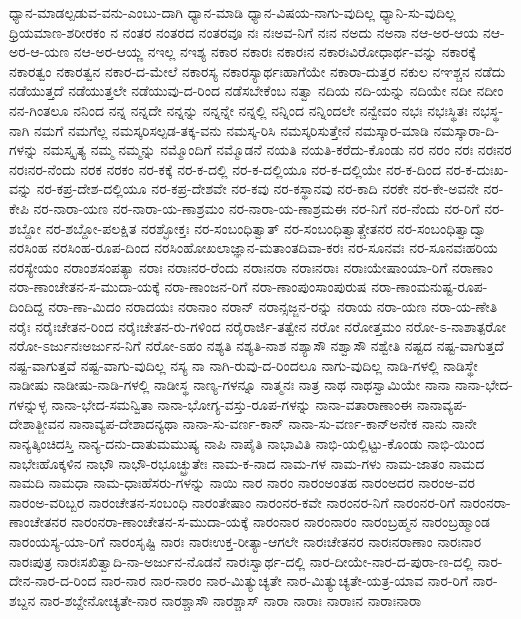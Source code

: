 {ಧ್ಯಾನ-ಮಾಡಲ್ಪಡುವ-ವನು-ಎಂಬು-ದಾಗಿ
ಧ್ಯಾನ-ಮಾಡಿ
ಧ್ಯಾನ-ವಿಷಯ-ನಾಗು-ವುದಿಲ್ಲ
ಧ್ಯಾನಿ-ಸು-ವುದಿಲ್ಲ
ಧ್ರಿಯಮಾಣ-ಶರೀರಕಂ
ನ
ನಂತರ
ನಂತರದ
ನಂತರವೂ
ನಃ
ನಃಅವ-ನಿಗೆ
ನಃನ
ನಅದು
ನಅನಾ
ನಆ-ಅರ-ಆಯ
ನಆ-ಅರ-ಆ-ಯಣ
ನಆ-ಅರ-ಆಯ್ಣ
ನಇಲ್ಲ
ನಇಶ್ಯ
ನಕಾರ
ನಕಾರಃ
ನಕಾರಃನ
ನಕಾರಃವಿರೋಧಾರ್ಥ-ವನ್ನು
ನಕಾರಕ್ಕೆ
ನಕಾರತ್ವಂ
ನಕಾರತ್ವನ
ನಕಾರ-ದ-ಮೇಲೆ
ನಕಾರಸ್ಯ
ನಕಾರಸ್ಯಾರ್ಥಃಹಾಗೆಯೇ
ನಕಾರಾ-ದುತ್ತರ
ನಕುಲ
ನಞಶ್ಚನ
ನಡೆದು
ನಡೆಯುತ್ತದೆ
ನಡೆಯುತ್ತಲೇ
ನಡೆಯುವು-ದ-ರಿಂದ
ನಡೆಸಬೇಕೆಂಬ
ನತ್ವಾ
ನದಿಯ
ನದಿ-ಯನ್ನು
ನದಿಯೇ
ನದೀ
ನದೀಂ
ನನ-ಗಿಂತಲೂ
ನನಿಂದ
ನನ್ನ
ನನ್ನದೇ
ನನ್ನನ್ನು
ನನ್ನನ್ನೇ
ನನ್ನಲ್ಲಿ
ನನ್ನಿಂದ
ನನ್ನಿಂದಲೇ
ನನ್ವೇವಂ
ನಭಃ
ನಭಃಸ್ಥಿತಃ
ನಭಸ್ಥ-ನಾಗಿ
ನಮಗೆ
ನಮಗೆಲ್ಲ
ನಮಸ್ಕರಿಸಲ್ಪಡ-ತಕ್ಕ-ವನು
ನಮಸ್ಕ-ರಿಸಿ
ನಮಸ್ಕರಿಸುತ್ತೇನೆ
ನಮಸ್ಕಾರ-ಮಾಡಿ
ನಮಸ್ಕಾರಾ-ದಿ-ಗಳನ್ನು
ನಮಸ್ಕೃತ್ಯ
ನಮ್ಮ
ನಮ್ಮನ್ನು
ನಮ್ಮೊಂದಿಗೆ
ನಮ್ಮೊಡನೆ
ನಯತಿ
ನಯತಿ-ಕರೆದು-ಕೊಂಡು
ನರ
ನರಂ
ನರಃ
ನರಃನರ
ನರಃನರ-ನೆಂದು
ನರಕ
ನರಕಂ
ನರ-ಕಕ್ಕೆ
ನರ-ಕ-ದಲ್ಲಿ
ನರ-ಕ-ದಲ್ಲಿಯೂ
ನರ-ಕ-ದಲ್ಲಿಯೇ
ನರ-ಕ-ದಿಂದ
ನರ-ಕ-ದುಃಖ-ವನ್ನು
ನರ-ಕಪ್ರ-ದೇಶ-ದಲ್ಲಿಯೂ
ನರ-ಕಪ್ರ-ದೇಶವೇ
ನರ-ಕವು
ನರ-ಕಸ್ಥಾನವು
ನರ-ಕಾದಿ
ನರಕೇ
ನರ-ಕೇ-ಅವನೇ
ನರ-ಕೇಪಿ
ನರ-ನಾರಾ-ಯಣ
ನರ-ನಾರಾ-ಯ-ಣಾಶ್ರಮಂ
ನರ-ನಾರಾ-ಯ-ಣಾಶ್ರಮಈ
ನರ-ನಿಗೆ
ನರ-ನೆಂದು
ನರ-ರಿಗೆ
ನರ-ಶಬ್ದೋ
ನರ-ಶಬ್ದೋ-ಪಲಕ್ಷಿತ
ನರಶ್ಛೋಕ್ತಃ
ನರ-ಸಂಬಂಧಿತ್ವಾತ್
ನರ-ಸಂಬಂಧಿತ್ವಾತ್ಚೇತನರ
ನರ-ಸಂಬಂಧಿತ್ವಾದ್ವಾ
ನರಸಿಂಹ
ನರಸಿಂಹ-ರೂಪ-ದಿಂದ
ನರಸಿಂಹೋಖಲಾಜ್ಞಾನ-ಮತಾಂತದಿವಾ-ಕರಃ
ನರ-ಸೂನವಃ
ನರ-ಸೂನವಃಹರಿಯ
ನರಸ್ಯೇಯಂ
ನರಾಂಶಸಂಪತ್ಯಾ
ನರಾಃ
ನರಾಃನರ-ರೆಂದು
ನರಾಃನರಾ
ನರಾಃನರಾಃ
ನರಾಃಯೇಷಾಂಯಾ-ರಿಗೆ
ನರಾಣಾಂ
ನರಾ-ಣಾಂಚೇತನ-ಸ-ಮುದಾ-ಯಕ್ಕೆ
ನರಾ-ಣಾಂಜನ-ರಿಗೆ
ನರಾ-ಣಾಂಪುಂಸಾಂಪುರುಷ
ನರಾ-ಣಾಂಮನುಷ್ಟ-ರೂಪ-ದಿಂದಿದ್ದ
ನರಾ-ಣಾ-ಮಿದಂ
ನರಾದಯಃ
ನರಾನಾಂ
ನರಾನ್
ನರಾನ್ಸಜ್ಜನ-ರನ್ನು
ನರಾಯ
ನರಾ-ಯಣ
ನರಾ-ಯ-ಣೇತಿ
ನರೈಃ
ನರೈಃಚೇತನ-ರಿಂದ
ನರೈಃಚೇತನ-ರು-ಗಳಿಂದ
ನರೈರಾರ್ಜಿ-ತತ್ವೇನ
ನರೋ
ನರೋತ್ತಮಂ
ನರೋ-ಽ-ನಾಶಾತ್ಪರೋ
ನರೋ-ಽರ್ಜುನಃಅರ್ಜುನ-ನಿಗೆ
ನರೋ-ಽಹಂ
ನಶ್ಯತಿ
ನಶ್ಯತಿ-ನಾಶ
ನಶ್ಯಾಸೌ
ನಶ್ವಾಸೌ
ನಶ್ವೇತಿ
ನಷ್ಟದ
ನಷ್ಟ-ವಾಗುತ್ತದೆ
ನಷ್ಟ-ವಾಗುತ್ತವೆ
ನಷ್ಟ-ವಾಗು-ವುದಿಲ್ಲ
ನಸ್ಯ
ನಾ
ನಾಗಿ-ರುವು-ದ-ರಿಂದಲೂ
ನಾಗು-ವುದಿಲ್ಲ
ನಾಡಿ-ಗಳಲ್ಲಿ
ನಾಡಿಸ್ಥೇ
ನಾಡೀಷು
ನಾಡೀಷು-ನಾಡಿ-ಗಳಲ್ಲಿ
ನಾಡೀಸ್ಥ
ನಾಣ್ಯ-ಗಳನ್ನೂ
ನಾತ್ಮನಃ
ನಾತ್ರ
ನಾಥ
ನಾಥಸ್ವಾಮಿಯೇ
ನಾನಾ
ನಾನಾ-ಭೇದ-ಗಳನ್ನುಳ್ಳ
ನಾನಾ-ಭೇದ-ಸಮನ್ವಿತಾ
ನಾನಾ-ಭೋಗ್ಯ-ವಸ್ತು-ರೂಪ-ಗಳನ್ನು
ನಾನಾ-ವತಾರಾಣಾಂಈ
ನಾನಾವ್ಯಪ-ದೇಶಾತ್ಜೀವನ
ನಾನಾವ್ಯಪ-ದೇಶಾದನ್ಯಥಾ
ನಾನಾ-ಸು-ವರ್ಣ-ಕಾನ್
ನಾನಾ-ಸು-ವರ್ಣ-ಕಾನ್ಅನೇಕ
ನಾನು
ನಾನೇ
ನಾನ್ಯತ್ಕಿಂಚಿದಸ್ತಿ
ನಾನ್ಯ-ದನು-ದಾತುಮಮುಷ್ಯ
ನಾಪಿ
ನಾಪೈತಿ
ನಾಭಾವಿತಿ
ನಾಭಿ-ಯಲ್ಲಿಟ್ಟು-ಕೊಂಡು
ನಾಭಿ-ಯಿಂದ
ನಾಭೇಃಹೊಕ್ಕಳಿನ
ನಾಭೌ
ನಾಭೌ-ರಭೂಚ್ಛ್ರುತೇಃ
ನಾಮ-ಕ-ನಾದ
ನಾಮ-ಗಳ
ನಾಮ-ಗಳು
ನಾಮ-ಜಾತಂ
ನಾಮದ
ನಾಮದಿ
ನಾಮಧಾ
ನಾಮ-ಧಾಃಹೆಸರು-ಗಳನ್ನು
ನಾಯಿ
ನಾರ
ನಾರಂ
ನಾರಂಅಂತಹ
ನಾರಂಅದರ
ನಾರಂಅ-ವರ
ನಾರಂಅ-ವರಿಬ್ಬರ
ನಾರಂಚೇತನ-ಸಂಬಂಧಿ
ನಾರಂತೇಷಾಂ
ನಾರಂನರ-ಕವೇ
ನಾರಂನರ-ನಿಗೆ
ನಾರಂನರ-ರಿಗೆ
ನಾರಂನರಾ-ಣಾಂಚೇತನರ
ನಾರಂನರಾ-ಣಾಂಚೇತನ-ಸ-ಮುದಾ-ಯಕ್ಕೆ
ನಾರಂನಾರ
ನಾರಂನಾರಂ
ನಾರಂಬ್ರಹ್ಮನ
ನಾರಂಬ್ರಹ್ಮಾಂಡ
ನಾರಂಯಸ್ಯ-ಯಾ-ರಿಗೆ
ನಾರಂಸೃಷ್ಟಿ
ನಾರಃ
ನಾರಃಉಕ್ತ-ರೀತ್ಯಾ-ಆಗಲೇ
ನಾರಃಚೇತನರ
ನಾರಃನರಾಣಾಂ
ನಾರಃನಾರ
ನಾರಃಪುತ್ರ
ನಾರಃಸಖಿತ್ವಾದಿ-ನಾ-ಅರ್ಜುನ-ನೊಡನೆ
ನಾರಃಸ್ವಾರ್ಥ-ದಲ್ಲಿ
ನಾರ-ದೀಯೇ-ನಾರ-ದ-ಪುರಾ-ಣ-ದಲ್ಲಿ
ನಾರ-ದೇನ-ನಾರ-ದ-ರಿಂದ
ನಾರ-ನಾರ
ನಾರ-ನಾರಂ
ನಾರ-ಮಿತ್ಯುಚ್ಯತೇ
ನಾರ-ಮಿತ್ಯುಚ್ಯತೇ-ಯತ್ರ-ಯಾವ
ನಾರ-ರಿಗೆ
ನಾರ-ಶಬ್ದನ
ನಾರ-ಶಬ್ದೇನೋಚ್ಯತೇ-ನಾರ
ನಾರಶ್ಚಾಸೌ
ನಾರಶ್ಚಾಸ್‌
ನಾರಾ
ನಾರಾಃ
ನಾರಾಃನ
ನಾರಾಃನಾರಾ
}
